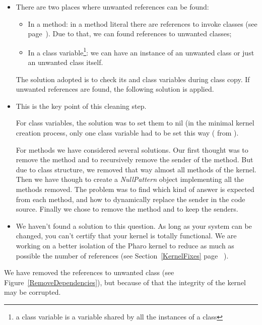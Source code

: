 \solutions
\begin{itemize}
	\item There are two places where unwanted references can be found:
		\begin{itemize}
			\item In a method: in a method literal there are references to invoke classes (see page~\pageref{literal}). Due to that, we can found references to unwanted classes;
			\item In a class variable\footnote{a class variable is a variable shared by all the instances of a class}: we can have an instance of an unwanted class or just an unwanted class itself.
		\end{itemize}
		The solution adopted is to check its  and class variables during class copy. If unwanted references are found, the following solution is applied.
	\item This is the key point of this cleaning step.
	
	For class variables, the solution was to set them to nil (in the minimal kernel creation process, only one class variable had to be set this way ( from ).

		
	For methods we have considered several solutions. Our first thought was to remove the method and to recursively remove the sender of the method. But due to class structure, we removed that way almost all methods of the kernel. Then we have though to create a \emph{NullPattern} object implementing all the methods removed. The problem was to find which kind of answer is expected from each method, and how to dynamically replace the sender in the code source. Finally we chose to remove the method and to keep the senders.
	\item We haven't found a solution to this question. %
As long as your system can be changed, you can't certify that your kernel is totally functional.
We are working on a better isolation of the \gls{Pharo} kernel to reduce as much as possible the number of references (see Section~\ref{KernelFixes} page~\pageref{KernelFixes} ).
\end{itemize}

\inanutshell We have removed the references to unwanted class (see Figure~\ref{RemoveDependencies}), but because of that the integrity of the kernel may be corrupted.

